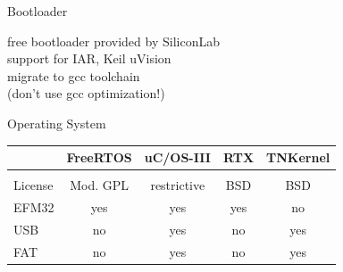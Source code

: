 \documentclass[compress,red]{beamer}
\begin{document}

\begin{frame}{Bootloader}
  \Large
  \begin{center}
    free bootloader provided by SiliconLab \\
    \vskip 1cm
    support for IAR, Keil uVision \\
    \vskip 1cm
    migrate to gcc toolchain \\
    \vskip 1cm
    (don't use gcc optimization!)
  \end{center}

\end{frame}


\begin{frame}{Operating System}
 \large
 \begin{center}
  \begin{tabular}{lcccc}
    & FreeRTOS & uC/OS-III & RTX & TNKernel \\[2.5mm]
    \hline
    \\[1mm]
   License & Mod. GPL & restrictive & BSD & BSD \\[5mm]
   EFM32   & yes      & yes         & yes & no  \\[5mm]
   USB     & no       & yes         & no  & yes \\[5mm]
   FAT     & no       & yes         & no  & yes \\
  \end{tabular}
 \end{center}

\end{frame}

\end{document}
